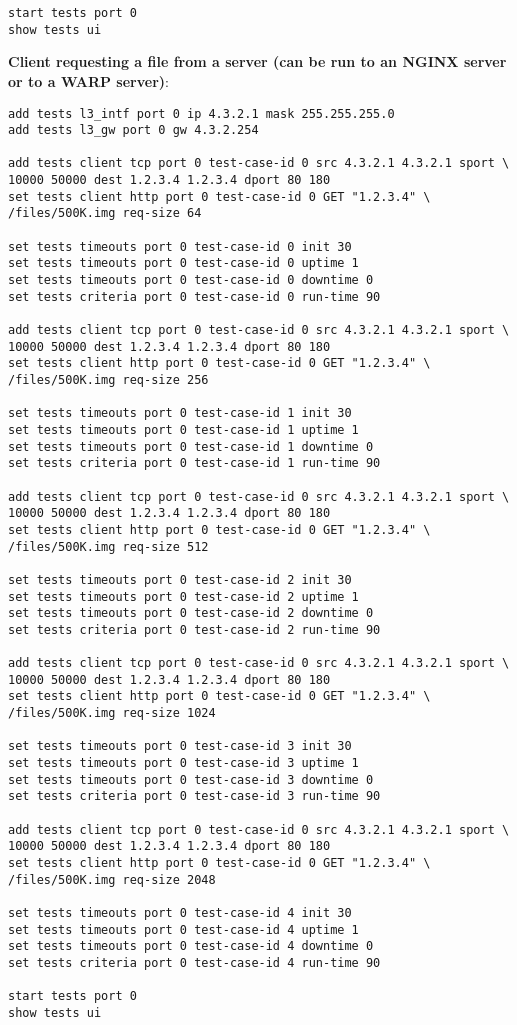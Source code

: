 \begin{landscape}
\begin{verbatim}
start tests port 0
show tests ui
\end{verbatim}

\textbf{Client requesting a file from a server (can be run to an NGINX server or to a WARP server)}:
\begin{verbatim}
add tests l3_intf port 0 ip 4.3.2.1 mask 255.255.255.0
add tests l3_gw port 0 gw 4.3.2.254

add tests client tcp port 0 test-case-id 0 src 4.3.2.1 4.3.2.1 sport \ 
10000 50000 dest 1.2.3.4 1.2.3.4 dport 80 180
set tests client http port 0 test-case-id 0 GET "1.2.3.4" \
/files/500K.img req-size 64

set tests timeouts port 0 test-case-id 0 init 30
set tests timeouts port 0 test-case-id 0 uptime 1
set tests timeouts port 0 test-case-id 0 downtime 0
set tests criteria port 0 test-case-id 0 run-time 90

add tests client tcp port 0 test-case-id 0 src 4.3.2.1 4.3.2.1 sport \ 
10000 50000 dest 1.2.3.4 1.2.3.4 dport 80 180
set tests client http port 0 test-case-id 0 GET "1.2.3.4" \
/files/500K.img req-size 256

set tests timeouts port 0 test-case-id 1 init 30
set tests timeouts port 0 test-case-id 1 uptime 1
set tests timeouts port 0 test-case-id 1 downtime 0
set tests criteria port 0 test-case-id 1 run-time 90

add tests client tcp port 0 test-case-id 0 src 4.3.2.1 4.3.2.1 sport \ 
10000 50000 dest 1.2.3.4 1.2.3.4 dport 80 180
set tests client http port 0 test-case-id 0 GET "1.2.3.4" \
/files/500K.img req-size 512

set tests timeouts port 0 test-case-id 2 init 30
set tests timeouts port 0 test-case-id 2 uptime 1
set tests timeouts port 0 test-case-id 2 downtime 0
set tests criteria port 0 test-case-id 2 run-time 90

add tests client tcp port 0 test-case-id 0 src 4.3.2.1 4.3.2.1 sport \ 
10000 50000 dest 1.2.3.4 1.2.3.4 dport 80 180
set tests client http port 0 test-case-id 0 GET "1.2.3.4" \
/files/500K.img req-size 1024

set tests timeouts port 0 test-case-id 3 init 30
set tests timeouts port 0 test-case-id 3 uptime 1
set tests timeouts port 0 test-case-id 3 downtime 0
set tests criteria port 0 test-case-id 3 run-time 90

add tests client tcp port 0 test-case-id 0 src 4.3.2.1 4.3.2.1 sport \ 
10000 50000 dest 1.2.3.4 1.2.3.4 dport 80 180
set tests client http port 0 test-case-id 0 GET "1.2.3.4" \
/files/500K.img req-size 2048

set tests timeouts port 0 test-case-id 4 init 30
set tests timeouts port 0 test-case-id 4 uptime 1
set tests timeouts port 0 test-case-id 4 downtime 0
set tests criteria port 0 test-case-id 4 run-time 90

start tests port 0
show tests ui
\end{verbatim}

\end{landscape}
